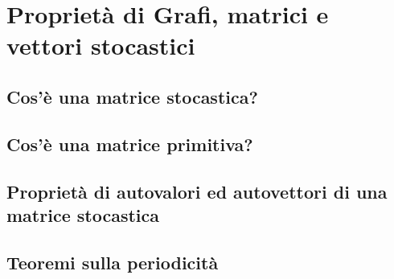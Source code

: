 \documentclass[\main/main.tex]{subfiles}
\begin{document}
\section{Proprietà di Grafi, matrici e vettori stocastici}
\subsection{Cos'è una matrice stocastica?}
\subsection{Cos'è una matrice primitiva?}
\subsection{Proprietà di autovalori ed autovettori di una matrice stocastica}
\subsection{Teoremi sulla periodicità}
\end{document}

